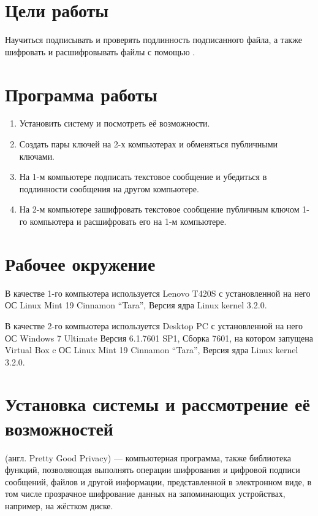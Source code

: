 





\tableofcontents
\lstlistoflistings
\newpage

\section{Цели работы}

Научиться подписывать и проверять подлинность подписанного файла, а также шифровать и расшифровывать файлы с помощью .

\section{Программа работы}

\begin{enumerate}
	\item Установить  систему и посмотреть её возможности.
	\item Создать пары  ключей на 2-х компьютерах и обменяться публичными ключами.
	\item На 1-м компьютере подписать текстовое сообщение и убедиться в подлинности сообщения на другом компьютере.
	\item На 2-м компьютере зашифровать текстовое сообщение публичным ключом 1-го компьютера и расшифровать его на 1-м компьютере.
\end{enumerate}

\section{Рабочее окружение}

В качестве 1-го компьютера используется Lenovo T420S с установленной на него ОС Linux Mint 19 Cinnamon “Tara”, Версия ядра Linux kernel 3.2.0.

В качестве 2-го компьютера используется Desktop PC с установленной на него ОС Windows 7 Ultimate Версия 6.1.7601 SP1, Сборка 7601, на котором запущена Virtual Box c ОС Linux Mint 19 Cinnamon “Tara”, Версия ядра Linux kernel 3.2.0.

\section{Установка  системы  и рассмотрение её возможностей}

 (англ. Pretty Good Privacy) --- компьютерная программа, также библиотека функций, позволяющая выполнять операции шифрования и цифровой подписи сообщений, файлов и другой информации, представленной в электронном виде, в том числе прозрачное шифрование данных на запоминающих устройствах, например, на жёстком диске.

